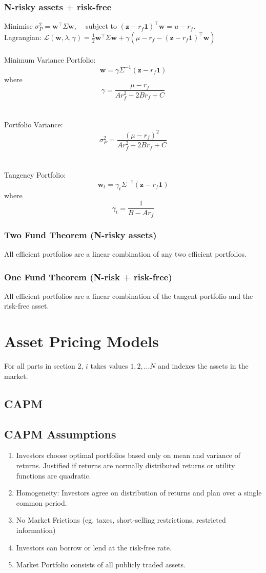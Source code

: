 \documentclass[11pt]{article}
\begin{document}
	\subsubsection{N-risky assets + risk-free}
	Minimise \( \sigma_P^2 = \bm{w}^{\top} \Sigma \bm{w} \), \( \quad \)subject to \( (\bm{z} - r_{f}\bm{1})^{\top}\bm{w} = u - r_f \).\\[5pt]
	Lagrangian: \( \mathcal{L}(\bm{w}, \lambda, \gamma)  = \frac{1}{2}\bm{w}^{\top}\Sigma\bm{w} + \gamma(\mu - r_f - (\bm{z} - r_f \bm{1})^{\top}\bm{w}) \)\\\\
	Minimum Variance Portfolio: \[ \bm{w} = \gamma\Sigma^{-1}(\bm{z} - r_f \bm{1}) \] where \[ \gamma = \frac{\mu - r_f}{A r_f^2 -2B r_f + C} \]\\\\
	Portfolio Variance: \[ \sigma_P^2 = \frac{(\mu - r_f)^2}{A r_f^2 -2B r_f + C} \]\\\\
	Tangency Portfolio: \[ \bm{w}_t = \gamma_t \Sigma^{-1}(\bm{z} - r_f \bm{1}) \] where \[ \gamma_t = \frac{1}{B - Ar_f} \]
	\newpage
	\subsubsection{Two Fund Theorem (N-risky assets)}
	All efficient portfolios are a linear combination of any two efficient portfolios. 
	\subsubsection{One Fund Theorem (N-risk + risk-free)}
	All efficient portfolios are a linear combination of the tangent portfolio and the risk-free asset.
	
	\newpage
	\section{Asset Pricing Models}
	For all parts in section 2, \( i \) takes values \( 1,2,... N \) and indexes the assets in the market.
	\subsection{CAPM}
	\subsection{CAPM Assumptions}
	\begin{enumerate}
		\item Investors choose optimal portfolios based only on mean and variance of returns. Justified if returns are normally distributed returns or utility functions are quadratic.
		\item Homogeneity: Investors agree on distribution of returns and plan over a single common period.
		\item No Market Frictions (eg. taxes, short-selling restrictions, restricted information)
		\item Investors can borrow or lend at the risk-free rate.
		\item Market Portfolio consists of all publicly traded assets.
	\end{enumerate}
\end{document}
